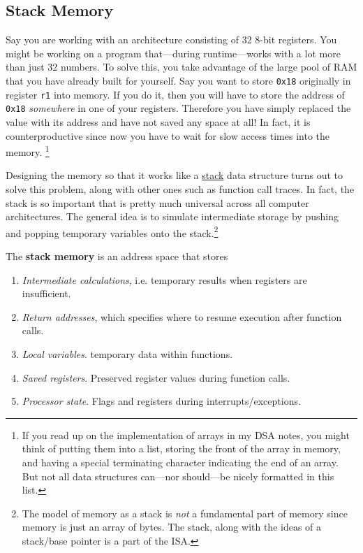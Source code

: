 \subsection{Stack Memory} 

  Say you are working with an architecture consisting of 32 8-bit registers. You might be working on a program that---during runtime---works with a lot more than just 32 numbers. To solve this, you take advantage of the large pool of RAM that you have already built for yourself. Say you want to store \texttt{0x18} originally in register \texttt{r1} into memory. If you do it, then you will have to store the address of \texttt{0x18} \textit{somewhere} in one of your registers. Therefore you have simply replaced the value with its address and have not saved any space at all! In fact, it is counterproductive since now you have to wait for slow access times into the memory. \footnote{If you read up on the implementation of arrays in my DSA notes, you might think of putting them into a list, storing the front of the array in memory, and having a special terminating character indicating the end of an array. But not all data structures can---nor should---be nicely formatted in this list.}

  Designing the memory so that it works like a \hyperref[dsa-def:stack]{stack} data structure turns out to solve this problem, along with other ones such as function call traces. In fact, the stack is so important that is pretty much universal across all computer architectures. The general idea is to simulate intermediate storage by pushing and popping temporary variables onto the stack.\footnote{The model of memory as a stack is \textit{not} a fundamental part of memory since memory is just an array of bytes. The stack, along with the ideas of a stack/base pointer is a part of the ISA.}

  \begin{definition}
    The \textbf{stack memory} is an address space that stores 
    \begin{enumerate}
      \item \textit{Intermediate calculations}, i.e. temporary results when registers are insufficient. 
      \item \textit{Return addresses}, which specifies where to resume execution after function calls. 
      \item \textit{Local variables}. temporary data within functions. 
      \item \textit{Saved registers}. Preserved register values during function calls. 
      \item \textit{Processor state}. Flags and registers during interrupts/exceptions. 
    \end{enumerate}
  \end{definition}

